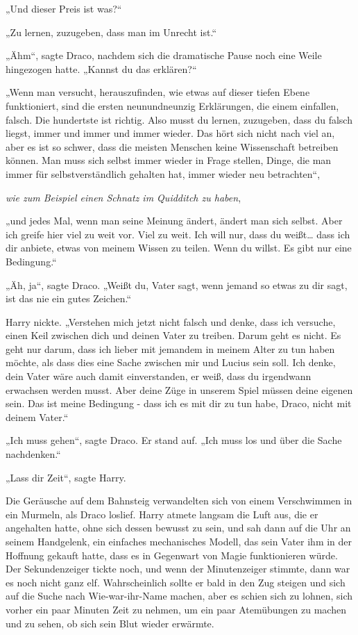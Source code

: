 {„Und dieser Preis ist was?“

„Zu lernen, zuzugeben, dass man im Unrecht ist.“

„Ähm“, sagte Draco, nachdem sich die dramatische Pause noch eine Weile hingezogen hatte. „Kannst du das erklären?“

„Wenn man versucht, herauszufinden, wie etwas auf dieser tiefen Ebene funktioniert, sind die ersten neunundneunzig Erklärungen, die einem einfallen, falsch. Die hundertste ist richtig. Also musst du lernen, zuzugeben, dass du falsch liegst, immer und immer und immer wieder. Das hört sich nicht nach viel an, aber es ist so schwer, dass die meisten Menschen keine Wissenschaft betreiben können. Man muss sich selbst immer wieder in Frage stellen, Dinge, die man immer für selbstverständlich gehalten hat, immer wieder neu betrachten“,

\emph{wie zum Beispiel einen Schnatz im Quidditch zu haben},

„und jedes Mal, wenn man seine Meinung ändert, ändert man sich selbst. Aber ich greife hier viel zu weit vor. Viel zu weit. Ich will nur, dass du weißt… dass ich dir anbiete, etwas von meinem Wissen zu teilen. Wenn du willst. Es gibt nur eine Bedingung.“

„Äh, ja“, sagte Draco. „Weißt du, Vater sagt, wenn jemand so etwas zu dir sagt, ist das nie ein gutes Zeichen.“

Harry nickte. „Verstehen mich jetzt nicht falsch und denke, dass ich versuche, einen Keil zwischen dich und deinen Vater zu treiben. Darum geht es nicht. Es geht nur darum, dass ich lieber mit jemandem in meinem Alter zu tun haben möchte, als dass dies eine Sache zwischen mir und Lucius sein soll. Ich denke, dein Vater wäre auch damit einverstanden, er weiß, dass du irgendwann erwachsen werden musst. Aber deine Züge in unserem Spiel müssen deine eigenen sein. Das ist meine Bedingung - dass ich es mit dir zu tun habe, Draco, nicht mit deinem Vater.“

„Ich muss gehen“, sagte Draco. Er stand auf. „Ich muss los und über die Sache nachdenken.“

„Lass dir Zeit“, sagte Harry.

Die Geräusche auf dem Bahnsteig verwandelten sich von einem Verschwimmen in ein Murmeln, als Draco loslief. Harry atmete langsam die Luft aus, die er angehalten hatte, ohne sich dessen bewusst zu sein, und sah dann auf die Uhr an seinem Handgelenk, ein einfaches mechanisches Modell, das sein Vater ihm in der Hoffnung gekauft hatte, dass es in Gegenwart von Magie funktionieren würde. Der Sekundenzeiger tickte noch, und wenn der Minutenzeiger stimmte, dann war es noch nicht ganz elf. Wahrscheinlich sollte er bald in den Zug steigen und sich auf die Suche nach Wie-war-ihr-Name machen, aber es schien sich zu lohnen, sich vorher ein paar Minuten Zeit zu nehmen, um ein paar Atemübungen zu machen und zu sehen, ob sich sein Blut wieder erwärmte.

}
